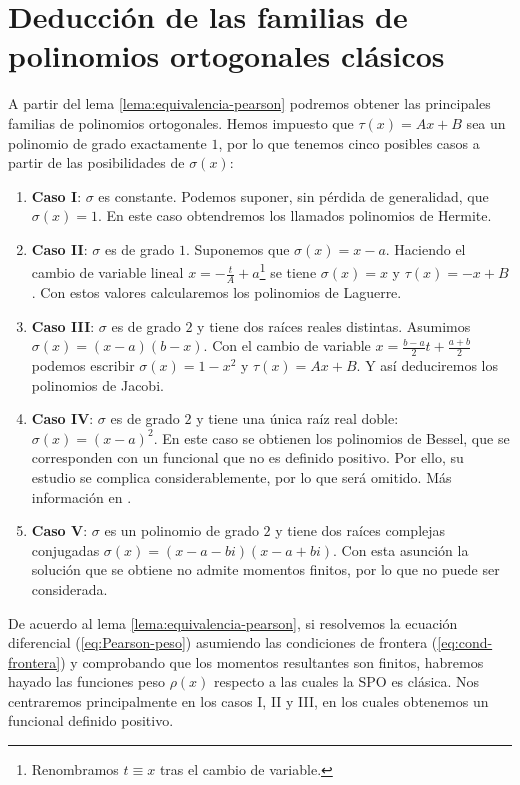 \section{Deducción de las familias de polinomios ortogonales clásicos}
\label{section:deduccion-clasicos}

A partir del lema \ref{lema:equivalencia-pearson} podremos obtener las principales familias de polinomios ortogonales. Hemos impuesto que $\tau(x)=Ax+B$ sea un polinomio de grado exactamente $1$, por lo que tenemos cinco posibles casos a partir de las posibilidades de $\sigma(x)$:

\begin{enumerate}
    \item \textbf{Caso I}: $\sigma$ es constante. Podemos suponer, sin pérdida de generalidad, que $\sigma(x) = 1$. En este caso obtendremos los llamados polinomios de Hermite.
    \item \textbf{Caso II}: $\sigma$ es de grado $1$. Suponemos que $\sigma(x) = x-a$. Haciendo el cambio de variable lineal $x = -\frac t A+a$\footnote{Renombramos $t\equiv x$ tras el cambio de variable.} se tiene $\sigma(x) = x$ y $\tau(x)=-x+B$. Con estos valores calcularemos los polinomios de Laguerre.
    \item \textbf{Caso III}: $\sigma$ es de grado $2$ y tiene dos raíces reales distintas. Asumimos $\sigma(x) = (x-a)(b-x)$. Con el cambio de variable $x = \frac{b-a}{2}t + \frac{a+b}{2}$ podemos escribir $\sigma(x)=1-x^2$ y $\tau(x)=Ax+B$. Y así deduciremos los polinomios de Jacobi.
    \item \textbf{Caso IV}: $\sigma$ es de grado $2$ y tiene una única raíz real doble: $\sigma(x) = (x-a)^2$. En este caso se obtienen los polinomios de Bessel, que se corresponden con un funcional que no es definido positivo. Por ello, su estudio se complica considerablemente, por lo que será omitido. Más información en \cite{Bessel-polynomials}.  
    \item \textbf{Caso V}: $\sigma$ es un polinomio de grado $2$ y tiene dos raíces complejas conjugadas \linebreak $\sigma(x) = (x-a-bi)(x-a+bi)$. Con esta asunción la solución que se obtiene no admite momentos finitos, por lo que no puede ser considerada.
\end{enumerate}

De acuerdo al lema \ref{lema:equivalencia-pearson}, si resolvemos la ecuación diferencial (\ref{eq:Pearson-peso}) asumiendo las condiciones de frontera (\ref{eq:cond-frontera}) y comprobando que los momentos resultantes son finitos, habremos hayado las funciones peso $\rho(x)$ respecto a las cuales la SPO es clásica. Nos centraremos principalmente en los casos I, II y III, en los cuales obtenemos un funcional definido positivo.

